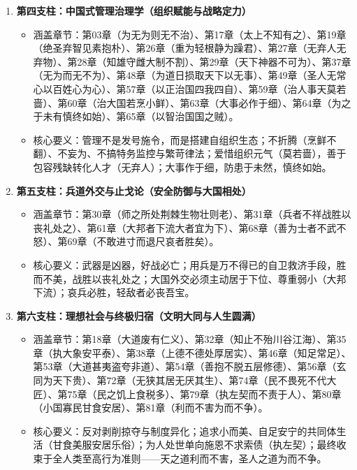 \begin{enumerate}
    \item \textbf{第四支柱：中国式管理治理学（组织赋能与战略定力）}
    \begin{itemize}
        \item 涵盖章节：第03章（为无为则无不治）、第17章（太上不知有之）、第19章（绝圣弃智见素抱朴）、第26章（重为轻根静为躁君）、第27章（无弃人无弃物）、第28章（知雄守雌大制不割）、第29章（天下神器不可为）、第37章（无为而无不为）、第48章（为道日损取天下以无事）、第49章（圣人无常心以百姓心为心）、第57章（以正治国四我四自）、第59章（治人事天莫若啬）、第60章（治大国若烹小鲜）、第63章（大事必作于细）、第64章（为之于未有慎终如始）、第65章（以智治国国之贼）。
        \item 核心要义：管理不是发号施令，而是搭建自组织生态；不折腾（烹鲜不翻）、不妄为、不搞特务监控与繁苛律法；爱惜组织元气（莫若啬），善于包容残缺转化人才（无弃人）；大事作于细，防患于未然，慎终如始。
    \end{itemize}

    \item \textbf{第五支柱：兵道外交与止戈论（安全防御与大国相处）}
    \begin{itemize}
        \item 涵盖章节：第30章（师之所处荆棘生物壮则老）、第31章（兵者不祥战胜以丧礼处之）、第61章（大邦者下流大者宜为下）、第68章（善为士者不武不怒）、第69章（不敢进寸而退尺哀者胜矣）。
        \item 核心要义：武器是凶器，好战必亡；用兵是万不得已的自卫救济手段，胜而不美，战胜以丧礼处之；大国外交必须主动居于下位、尊重弱小（大邦下流）；哀兵必胜，轻敌者必丧吾宝。
    \end{itemize}

    \item \textbf{第六支柱：理想社会与终极归宿（文明大同与人生圆满）}
    \begin{itemize}
        \item 涵盖章节：第18章（大道废有仁义）、第32章（知止不殆川谷江海）、第35章（执大象安平泰）、第38章（上德不德处厚居实）、第46章（知足常足）、第53章（大道甚夷盗夸非道）、第54章（善抱不脱五层修德）、第56章（玄同为天下贵）、第72章（无狭其居无厌其生）、第74章（民不畏死不代大匠）、第75章（民之饥上食税多）、第79章（执左契而不责于人）、第80章（小国寡民甘食安居）、第81章（利而不害为而不争）。
        \item 核心要义：反对剥削掠夺与制度异化；追求小而美、自足安宁的共同体生活（甘食美服安居乐俗）；为人处世单向施恩不求索债（执左契）；最终收束于全人类至高行为准则——天之道利而不害，圣人之道为而不争。
    \end{itemize}
\end{enumerate}

